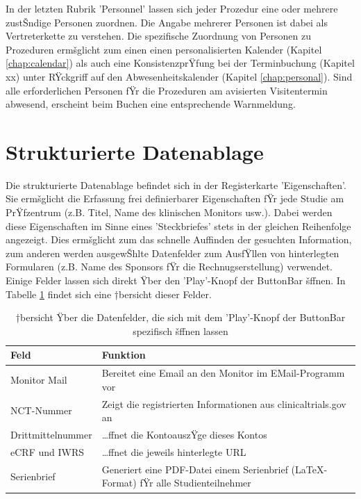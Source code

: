 \documentclass[11pt,oneside]{scrbook}
\begin{document}
In der letzten Rubrik 'Personnel' lassen sich jeder Prozedur eine oder mehrere zustŠndige Personen zuordnen. Die Angabe mehrerer Personen ist dabei als Vertreterkette zu verstehen. Die spezifische Zuordnung von Personen zu Prozeduren ermšglicht zum einen einen personalisierten Kalender (Kapitel \ref{chap:calendar}) als auch eine KonsistenzprŸfung bei der Terminbuchung (Kapitel xx) unter RŸckgriff auf den Abwesenheitskalender (Kapitel \ref{chap:personal}).  Sind alle erforderlichen Personen fŸr die Prozeduren am  avisierten Visitentermin  abwesend, erscheint beim Buchen eine entsprechende   Warnmeldung.

\section{Strukturierte Datenablage}
\label{chap:data}
Die strukturierte Datenablage befindet sich in der Registerkarte 'Eigenschaften'. Sie ermšglicht die  Erfassung frei definierbarer Eigenschaften  fŸr jede Studie am PrŸfzentrum (z.B. Titel, Name des klinischen Monitors usw.). Dabei werden diese Eigenschaften im Sinne eines 'Steckbriefes' stets in der gleichen  Reihenfolge angezeigt. Dies ermšglicht zum das schnelle Auffinden der gesuchten Information, zum anderen werden ausgewŠhlte Datenfelder zum AusfŸllen von hinterlegten Formularen (z.B. Name des Sponsors fŸr die Rechnugserstellung) verwendet. Einige Felder lassen sich direkt Ÿber den 'Play'-Knopf der ButtonBar šffnen. In Tabelle \ref{tab:playbutton} findet sich eine †bersicht  dieser Felder.

\begin{table}[htdp]
\caption{†bersicht Ÿber die Datenfelder, die sich mit dem 'Play'-Knopf der ButtonBar spezifisch šffnen lassen}
\begin{center}
\begin{tabular}{p{4cm}p{8cm}}
Feld & Funktion\\\hline
Monitor Mail  & Bereitet eine Email an den Monitor im EMail-Programm vor\\
NCT-Nummer & Zeigt die registrierten Informationen aus clinicaltrials.gov an\\
Drittmittelnummer & …ffnet die KontoauszŸge dieses Kontos\\
eCRF und IWRS & …ffnet die jeweils hinterlegte URL\\
Serienbrief & Generiert eine PDF-Datei einem Serienbrief (\LaTeX-Format) fŸr alle Studienteilnehmer\\
\end{tabular}
\end{center}
\label{tab:playbutton}
\end{table}%
 
\end{document}
